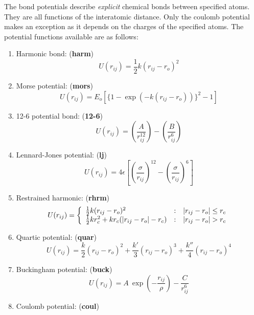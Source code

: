 The bond potentials describe {\em explicit}
chemical bonds between specified atoms.  They are all
functions of the interatomic distance.  Only the coulomb potential
makes an exception as it depends on the charges of the specified
atoms.  The potential functions available are as follows:
\begin{enumerate}
\item Harmonic bond:  ({\bf harm})
\begin{equation}
U(r_{ij}) = \frac{1}{2} k (r_{ij}-r_{o})^{2}
\end{equation}
\item Morse potential:  ({\bf mors})
\begin{equation}
U(r_{ij}) = E_{o} [\{1-\exp(-k(r_{ij}-r_{o}))\}^{2}-1]
\end{equation}
\item 12-6 potential bond:  ({\bf 12-6})
\begin{equation}
U(r_{ij}) = \left(\frac{A}{r_{ij}^{12}}\right)-\left(\frac{B}{r_{ij}^{6}}\right)
\end{equation}
\item Lennard-Jones potential:  ({\bf lj})
\begin{equation}
U(r_{ij}) = 4\epsilon\left[\left
(\frac{\sigma}{r_{ij}}\right)^{12}-\left(\frac{\sigma}{r_{ij}}\right)^{6}\right]
\end{equation}
\item Restrained harmonic:  ({\bf rhrm})
\begin{equation}
U(r_{ij}) = \left\{ \begin{array} {l@{\quad:\quad}l}
\frac{1}{2}k(r_{ij}-r_{o})^{2} & |r_{ij}-r_{o}|\le r_{c} \\
\frac{1}{2}kr_{c}^{2}+kr_{c}(|r_{ij}-r_{o}|-r_{c}) & |r_{ij}-r_{o}| > r_{c}
\end{array} \right.
\end{equation}
\item Quartic potential:  ({\bf quar})
\begin{equation}
U(r_{ij}) = \frac{k}{2}(r_{ij}-r_{o})^{2}+\frac{k'}{3}(r_{ij}-r_{o})^{3}+\frac{k''}{4}(r_{ij}-r_{o})^{4}
\end{equation}
\item Buckingham potential:  ({\bf buck})
\begin{equation}
U(r_{ij}) = A~\exp\left(-\frac{r_{ij}}{\rho}\right)-\frac{C}{r_{ij}^{6}}
\end{equation}
\item Coulomb potential:  ({\bf coul})
\begin{equation}

\end{equation}
\end{enumerate}
